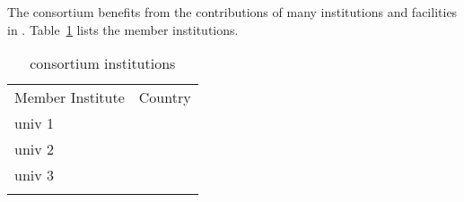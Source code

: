 The  consortium benefits from the contributions of many institutions and facilities in .  Table~\ref{tab:prism-institutes}
lists the member institutions. 

\begin{longtable}
{ll}
\caption{ consortium institutions}\\ \colhline
\rowcolor{dunetablecolor} Member Institute  &  Country       \\  \toprowrule
univ 1 &  \\ \colhline
univ 2 &  \\ \colhline
univ 3 &  \\ 
\label{tab:prism-institutes}
\end{longtable}












